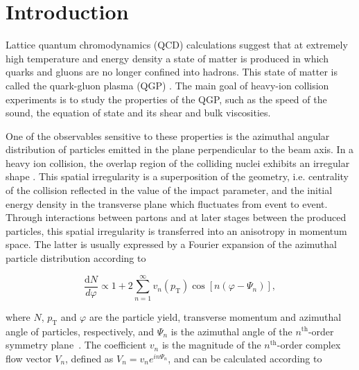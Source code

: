 \section{Introduction}
\label{Sec:Introduction}

Lattice quantum chromodynamics (QCD) calculations \cite{Borsanyi:2010cj,Bhattacharya:2014ara} suggest that at extremely high temperature and energy density a state of matter is produced in which quarks and gluons are no longer confined into hadrons. This state of matter is called the quark-gluon plasma (QGP) \cite{Shuryak:1984nq, Cleymans:1985wb, Bass:1998vz}. The main goal of heavy-ion collision experiments is to study the properties of the QGP, such as the speed of the sound, the equation of state and its shear and bulk viscosities.

One of the observables sensitive to these properties is the azimuthal angular distribution of particles emitted in the plane perpendicular to the beam axis. In a heavy ion collision, the overlap region of the colliding nuclei exhibits an irregular shape \cite{Miller:2003kd,Bhalerao:2006tp, Alver:2008zza, Alver:2010gr, Alver:2010dn, Manly:2005zy, Voloshin:2006gz}. This spatial irregularity is a superposition of the geometry, i.e. centrality of the collision reflected in the value of the impact parameter, and the initial energy density in the transverse plane which fluctuates from event to event. Through interactions between partons and at later stages between the produced particles, this spatial irregularity is transferred into an anisotropy in momentum space. The latter is usually expressed by a Fourier expansion of the azimuthal particle distribution \cite{Voloshin:1994mz} according to

\begin{equation}
\frac{\mathrm{d}N}{d\varphi} \propto 1+2\sum_{n=1}^{\infty} v_n(p_{\mathrm{T}}) \cos[n(\varphi - \Psi_n)],
\label{Eq:Fourier}
\end{equation}



\noindent where $N$, $p_{\mathrm{T}}$ and $\varphi$ are the particle yield, transverse momentum and azimuthal angle of particles, respectively, and $\Psi_n$ is the azimuthal angle of the $n^{\mathrm{th}}$-order symmetry plane~\cite{Voloshin:2006gz,Bhalerao:2006tp,Alver:2008zza,Alver:2010gr,Alver:2010dn}. The coefficient $v_{n}$ is the magnitude of the $n^{\mathrm{th}}$-order complex flow vector $V_n$, defined as $V_{n} = v_{n}e^{in\Psi_n}$, and can be calculated according to 

